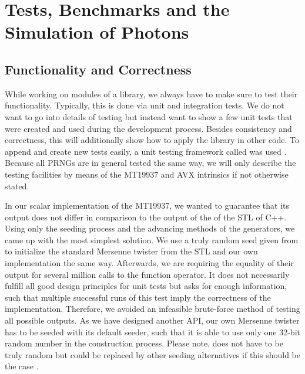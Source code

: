 \documentclass{stdlocal}
\begin{document}
\section{Tests, Benchmarks and the Simulation of Photons} %
\label{sec:testing_framework}

  \subsection{Functionality and Correctness} %
  \label{sub:unit_tests}
    While working on modules of a library, we always have to make sure to test their functionality.
    Typically, this is done via unit and integration tests.
    We do not want to go into details of testing but instead want to show a few unit tests that were created and used during the development process.
    Besides consistency and correctness, this will additionally show how to apply the library in other code.
    To append and create new tests easily, a unit testing framework called  was used \autocite{doctest}.
    Because all PRNGs are in general tested the same way, we will only describe the testing facilities by means of the MT19937 and AVX intrinsics if not otherwise stated.

    In our scalar implementation of the MT19937, we wanted to guarantee that its output does not differ in comparison to the output of the  of the STL of C++.
    Using only the seeding process and the advancing methods of the generators, we came up with the most simplest solution.
    We use a truly random seed given from  to initialize the standard Mersenne twister from the STL and our own implementation the same way.
    Afterwards, we are requiring the equality of their output for several million calls to the function operator.
    It does not necessarily fulfill all good design principles for unit tests but asks for enough information, such that multiple successful runs of this test imply the correctness of the implementation.
    Therefore, we avoided an infeasible brute-force method of testing all possible outputs.
    As we have designed another API, our own Mersenne twister has to be seeded with its default seeder, such that it is able to use only one 32-bit random number in the construction process.
    Please note,  does not have to be truly random \autocite{oneill-blog-rd,oneill-blog-seeding-surprises} but could be replaced by other seeding alternatives if this should be the case \autocite{oneill-blog-seed-entropy}.
\end{document}
